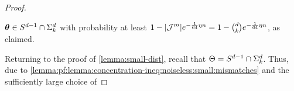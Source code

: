 \begin{proof}
\begin{subproof}
\(  \thetaX \in \SparseSphereSubspace{\nO}{\n}  \)
with probability at least
\(  1 - | \mathcal{J}''' | e^{-\frac{1}{64} \eta n} = 1 - \binom{d}{k} e^{-\frac{1}{64} \eta n}  \),
as claimed.
\end{subproof}
%
%
Returning to the proof of \LEMMA \ref{lemma:small-dist}, recall that
\(  \Theta = {S^{d-1} \cap \Sigma_{k}^{d}}  \).
Thus, due to \LEMMA \ref{lemma:pf:lemma:concentration-ineq:noiseless:small:mismatches} and the sufficiently large choice of

\end{proof}
